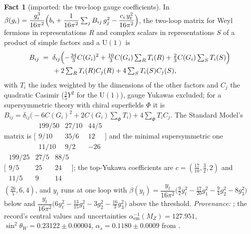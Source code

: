 \documentclass[11pt]{article}
\theoremstyle{definition}
\newtheorem{fact}[theorem]{Fact}
\begin{document}
\begin{fact}[imported: the two-loop gauge coefficients]\label{fact:twoloop}
In $\beta(g_{i}) = \dfrac{g_{i}^{3}}{16\pi^{2}}\Bigl(b_{i} + \dfrac{1}{16\pi^{2}}\sum_{j} B_{ij}\,g_{j}^{2} - \dfrac{c_{i}\,y_{t}^{2}}{16\pi^{2}}\Bigr)$, the two-loop matrix for Weyl fermions in representations $R$ and complex scalars in representations $S$ of a product of simple factors and a $\mathrm{U}(1)$ is
\begin{align*}
B_{ij} \;=\; {}& \delta_{ij}\Bigl(-\tfrac{34}{3}C(G_{i})^{2} + \tfrac{10}{3}C(G_{i})\textstyle\sum_{R} T_{i}(R) + \tfrac{2}{3}C(G_{i})\sum_{S} T_{i}(S)\Bigr) \\
& + 2\textstyle\sum_{R} T_{i}(R)C_{j}(R) + 4\sum_{S} T_{i}(S)C_{j}(S),
\end{align*}
with $T_{i}$ the index weighted by the dimensions of the other factors and $C_{j}$ the quadratic Casimir ($\tfrac35 Y^{2}$ for the $\mathrm{U}(1)$), gauge Yukawas excluded; for a supersymmetric theory with chiral superfields $\Phi$ it is $B_{ij} = \delta_{ij}\bigl(-6C(G_{i})^{2} + 2C(G_{i})\sum_{\Phi} T_{i}\bigr) + 4\sum_{\Phi} T_{i}C_{j}$. The Standard Model's matrix is $\bigl[\begin{smallmatrix} 199/50 & 27/10 & 44/5 \\ 9/10 & 35/6 & 12 \\ 11/10 & 9/2 & -26 \end{smallmatrix}\bigr]$ and the minimal supersymmetric one $\bigl[\begin{smallmatrix} 199/25 & 27/5 & 88/5 \\ 9/5 & 25 & 24 \\ 11/5 & 9 & 14 \end{smallmatrix}\bigr]$; the top-Yukawa coefficients are $c = (\tfrac{17}{10}, \tfrac32, 2)$ and $(\tfrac{26}{5}, 6, 4)$, and $y_{t}$ runs at one loop with $\beta(y_{t}) = \dfrac{y_{t}}{16\pi^{2}}\bigl(\tfrac92 y_{t}^{2} - \tfrac{17}{20}g_{1}^{2} - \tfrac94 g_{2}^{2} - 8g_{3}^{2}\bigr)$ below and $\dfrac{y_{t}}{16\pi^{2}}\bigl(6y_{t}^{2} - \tfrac{13}{15}g_{1}^{2} - 3g_{2}^{2} - \tfrac{16}{3}g_{3}^{2}\bigr)$ above the threshold. \emph{Provenance:} \cite{MachacekVaughn1983, MartinVaughn1994}; the record's central values and uncertainties $\alpha^{-1}_{\mathrm{em}}(M_{Z}) = 127.951$, $\sin^{2}\theta_{W} = 0.23122 \pm 0.00004$, $\alpha_{s} = 0.1180 \pm 0.0009$ from \cite{PDG2024}.
\end{fact}
\end{document}
